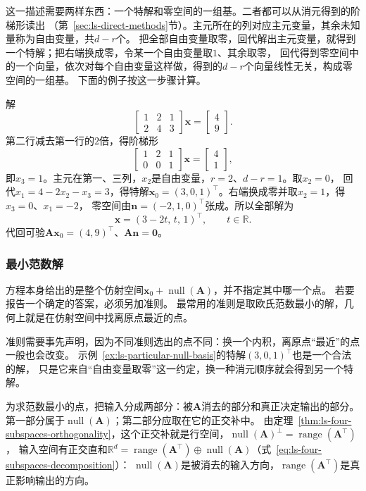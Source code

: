 这一描述需要两样东西：一个特解和零空间的一组基。二者都可以从消元得到的阶梯形读出
（第~\ref{sec:ls-direct-methods}节）。主元所在的列对应主元变量，其余未知量称为自由变量，共$d-r$个。
把全部自由变量取零，回代解出主元变量，就得到一个特解；把右端换成零，令某一个自由变量取$1$、其余取零，
回代得到零空间中的一个向量，依次对每个自由变量这样做，得到的$d-r$个向量线性无关，构成零空间的一组基。
下面的例子按这一步骤计算。

\begin{example}[从阶梯形读出特解与零空间的基]
\label{ex:ls-particular-null-basis}
解
\[
 \begin{bmatrix}1&2&1\\2&4&3\end{bmatrix}\bm x=\begin{bmatrix}4\\9\end{bmatrix}.
\]
第二行减去第一行的$2$倍，得阶梯形
\[
 \begin{bmatrix}1&2&1\\0&0&1\end{bmatrix}\bm x=\begin{bmatrix}4\\1\end{bmatrix},
\]
即$x_3=1$。主元在第一、三列，$x_2$是自由变量，$r=2$、$d-r=1$。取$x_2=0$，
回代$x_1=4-2x_2-x_3=3$，得特解$\bm x_0=(3,0,1)^\top$。右端换成零并取$x_2=1$，得$x_3=0$、$x_1=-2$，
零空间由$\bm n=(-2,1,0)^\top$张成。所以全部解为
\[
 \bm x=(3-2t,\,t,\,1)^\top,\qquad t\in\mathbb R .
\]
代回可验$\bm A\bm x_0=(4,9)^\top$、$\bm A\bm n=\bm0$。
\end{example}

\subsubsection{最小范数解}

方程本身给出的是整个仿射空间$\bm x_0+\operatorname{null}(\bm A)$，并不指定其中哪一个点。
若要报告一个确定的答案，必须另加准则。
最常用的准则是取欧氏范数最小的解，几何上就是在仿射空间中找离原点最近的点。

准则需要事先声明，因为不同准则选出的点不同：换一个内积，离原点“最近”的点一般也会改变。
示例~\ref{ex:ls-particular-null-basis}的特解$(3,0,1)^\top$也是一个合法的解，
只是它来自“自由变量取零”这一约定，换一种消元顺序就会得到另一个特解。

为求范数最小的点，把输入分成两部分：被$\bm A$消去的部分和真正决定输出的部分。
第一部分属于$\operatorname{null}(\bm A)$；第二部分应取在它的正交补中。
由定理~\ref{thm:ls-four-subspaces-orthogonality}，这个正交补就是行空间，$\operatorname{null}(\bm A)^\perp=\operatorname{range}(\bm A^\top)$，
输入空间有正交直和$\mathbb R^d=\operatorname{range}(\bm A^\top)\oplus\operatorname{null}(\bm A)$（式~\eqref{eq:ls-four-subspaces-decomposition}）：
$\operatorname{null}(\bm A)$是被消去的输入方向，$\operatorname{range}(\bm A^\top)$是真正影响输出的方向。

